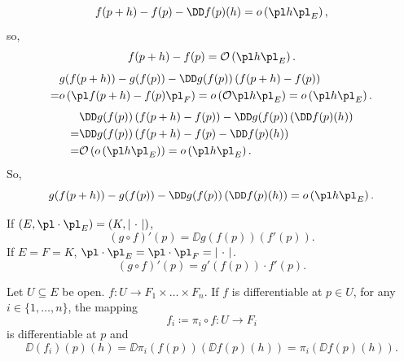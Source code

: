 \begin{proofenv}
    $$f(p+h)-f(p)-\DD f(p)(h)=o\left(\pl h\pl_E\right),$$
    so, 
    $$f(p+h)-f(p)=\mathcal{O}\left(\pl h\pl_E\right).$$
    \begin{align*}
        &g(f(p+h))-g(f(p))-\DD g(f(p))\left(f(p+h)-f(p)\right)\\
        =&o\left(\pl f(p+h)-f(p)\pl_F\right)=o\left(\mathcal{O}\pl h\pl_E\right)=o\left(\pl h\pl_E\right).
    \end{align*}
    \begin{align*}
        &\DD g(f(p))\left(f(p+h)-f(p)\right)-\DD g(f(p))\left(\DD f(p)(h)\right)\\
        =& \DD g(f(p))\left(f(p+h)-f(p)-\DD f(p)(h)\right)\\
        =& \mathcal{O}\left(o\left(\pl h\pl_E\right)\right)=o\left(\pl h\pl_E\right).
    \end{align*}
    So, 
    $$g(f(p+h))-g(f(p))-\DD g(f(p))\left(\DD f(p)(h)\right)=o\left(\pl h\pl_E\right).$$
\end{proofenv}
\begin{remark}
    If $(E,\pl\cdot\pl_E)=(K,\left|\ \cdot\ \right|)$, 
    $$(g\circ f)'(p)=\DD g(f(p))(f'(p)).$$
    If $E=F=K$, $\pl\cdot\pl_E=\pl\cdot\pl_F=\left|\ \cdot\ \right|$.
    $$(g\circ f)'(p)=g'(f(p))\cdot f'(p).$$ 
\end{remark}
\begin{remark}
    Let $U\subseteq E$ be open. $f:U\longrightarrow F_1\times \dots\times F_n$. If $f$ is differentiable at $p\in U$, for any $i\in\{1,\ldots,n\}$, the mapping
    $$f_i\coloneq\pi_i\circ f:U\longrightarrow F_i$$
    is differentiable at $p$ and
    $$\DD(f_i)(p)(h)=\DD \pi_i(f(p))\left(\DD f(p)(h)\right)=\pi_{i}\left(\DD f(p)(h)\right).$$
\end{remark}


